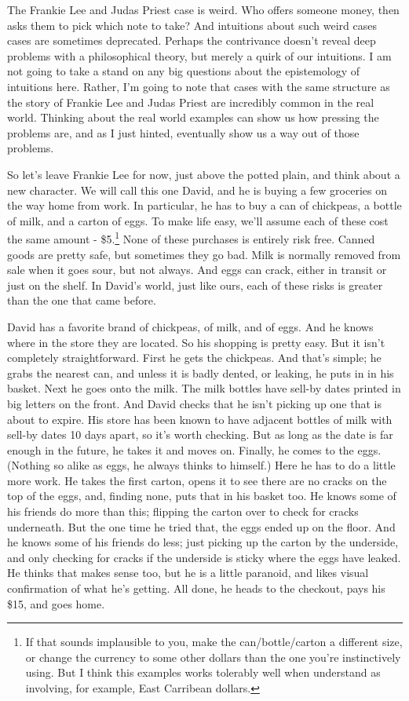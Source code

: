 \documentclass[11pt,]{book}
\let\rmarkdownfootnote\footnote%
\def\footnote{\protect\rmarkdownfootnote}
\begin{document}
The Frankie Lee and Judas Priest case is weird. Who offers someone money, then asks them to pick which note to take? And intuitions about such weird cases cases are sometimes deprecated. Perhaps the contrivance doesn't reveal deep problems with a philosophical theory, but merely a quirk of our intuitions. I am not going to take a stand on any big questions about the epistemology of intuitions here. Rather, I'm going to note that cases with the same structure as the story of Frankie Lee and Judas Priest are incredibly common in the real world. Thinking about the real world examples can show us how pressing the problems are, and as I just hinted, eventually show us a way out of those problems.

So let's leave Frankie Lee for now, just above the potted plain, and think about a new character. We will call this one David, and he is buying a few groceries on the way home from work. In particular, he has to buy a can of chickpeas, a bottle of milk, and a carton of eggs. To make life easy, we'll assume each of these cost the same amount - \$5.\footnote{If that sounds implausible to you, make the can/bottle/carton a different size, or change the currency to some other dollars than the one you're instinctively using. But I think this examples works tolerably well when understand as involving, for example, East Carribean dollars.} None of these purchases is entirely risk free. Canned goods are pretty safe, but sometimes they go bad. Milk is normally removed from sale when it goes sour, but not always. And eggs can crack, either in transit or just on the shelf. In David's world, just like ours, each of these risks is greater than the one that came before.

David has a favorite brand of chickpeas, of milk, and of eggs. And he knows where in the store they are located. So his shopping is pretty easy. But it isn't completely straightforward. First he gets the chickpeas. And that's simple; he grabs the nearest can, and unless it is badly dented, or leaking, he puts in in his basket. Next he goes onto the milk. The milk bottles have sell-by dates printed in big letters on the front. And David checks that he isn't picking up one that is about to expire. His store has been known to have adjacent bottles of milk with sell-by dates 10 days apart, so it's worth checking. But as long as the date is far enough in the future, he takes it and moves on. Finally, he comes to the eggs. (Nothing so alike as eggs, he always thinks to himself.) Here he has to do a little more work. He takes the first carton, opens it to see there are no cracks on the top of the eggs, and, finding none, puts that in his basket too. He knows some of his friends do more than this; flipping the carton over to check for cracks underneath. But the one time he tried that, the eggs ended up on the floor. And he knows some of his friends do less; just picking up the carton by the underside, and only checking for cracks if the underside is sticky where the eggs have leaked. He thinks that makes sense too, but he is a little paranoid, and likes visual confirmation of what he's getting. All done, he heads to the checkout, pays his \$15, and goes home.
\end{document}
